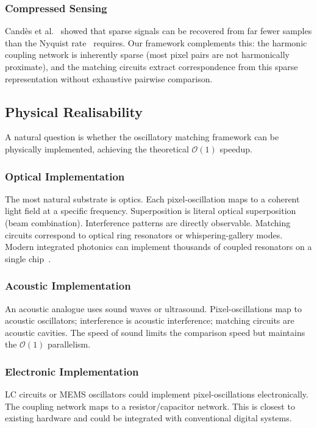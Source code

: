 \documentclass[11pt,twocolumn,a4paper]{article}
\newcommand{\BigO}{\mathcal{O}}
\begin{document}
\subsubsection{Compressed Sensing}
Cand\`{e}s et al.~\citep{candes2006} showed that sparse signals can be recovered from far fewer samples than the Nyquist rate~\citep{nyquist1928} requires. Our framework complements this: the harmonic coupling network is inherently sparse (most pixel pairs are not harmonically proximate), and the matching circuits extract correspondence from this sparse representation without exhaustive pairwise comparison.

\subsection{Physical Realisability}

A natural question is whether the oscillatory matching framework can be physically implemented, achieving the theoretical $\BigO(1)$ speedup.

\subsubsection{Optical Implementation}
The most natural substrate is optics. Each pixel-oscillation maps to a coherent light field at a specific frequency. Superposition is literal optical superposition (beam combination). Interference patterns are directly observable. Matching circuits correspond to optical ring resonators or whispering-gallery modes. Modern integrated photonics can implement thousands of coupled resonators on a single chip~\citep{hecht2017}.

\subsubsection{Acoustic Implementation}
An acoustic analogue uses sound waves or ultrasound. Pixel-oscillations map to acoustic oscillators; interference is acoustic interference; matching circuits are acoustic cavities. The speed of sound limits the comparison speed but maintains the $\BigO(1)$ parallelism.

\subsubsection{Electronic Implementation}
LC circuits or MEMS oscillators could implement pixel-oscillations electronically. The coupling network maps to a resistor/capacitor network. This is closest to existing hardware and could be integrated with conventional digital systems.
\end{document}
